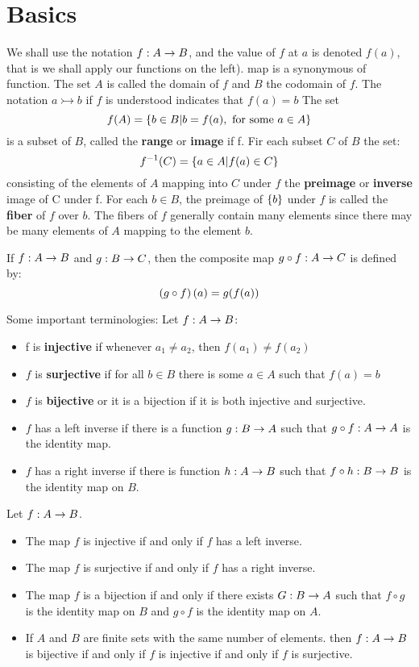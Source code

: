 \section{Basics}

We shall use the notation $ f : A \rightarrow B $, and the value of $f$ at $a$ is denoted $ f(a) $, that is we shall apply our functions on the left). map is a synonymous of function. The set $A$ is called the domain of $f$ and $B$ the codomain of $f$. The notation $ a \rightarrowtail b$ if $f$ is understood indicates that $ f(a) = b$ 
The set 
\[  f(A) = \left\lbrace b \in B | b = f(a), \textrm{ for some } a \in A \right\rbrace \]
is a subset of $ B $, called the \textbf{range } or \textbf{image} if f. Fir each subset $C$ of $B$ the set:
\[ f^{-1} (C) = \left\lbrace a \in A | f(a) \in C \right\rbrace \]
consisting of the elements of $A$ mapping into $C$ under $f$ the \textbf{preimage} or \textbf{inverse } image of C under f. For each $b \in B $, the preimage of $ \left\lbrace b \right\rbrace $ under $f$ is called the \textbf{fiber} of $f$ over $b$. The fibers of $f$ generally contain many elements since there may be many elements of $A$ mapping to the element $b$.

If $f : A \rightarrow B $ and $g : B \rightarrow C $, then the composite map $ g \circ f : A \rightarrow C $ is defined by:
\[ \left( g \circ f \right)(a) = g(f(a))\]

Some important terminologies:
Let $f : A \rightarrow B $:
\begin{itemize}
	\item f is \textbf{injective} if whenever $ a_1 \neq a_2 $, then $ f(a_1) \neq f(a_2) $
	\item $f$ is \textbf{surjective} if for all $b \in B$ there is some $a \in A$ such that $f(a) = b $
	\item $f$ is \textbf{bijective} or it is a bijection if it is both injective and surjective. 
	\item $f$ has a left inverse if there is a function $ g : B \rightarrow A $ such that $ g \circ f : A \rightarrow A $ is the identity map.
	\item $f$ has a right inverse if there is function $ h : A \rightarrow B $ such that $ f \circ h : B \rightarrow B $ is the identity map on $B$. 
\end{itemize}
\begin{prop}
	Let $ f : A \rightarrow B $.
	\begin{itemize}
		\item The map $f$ is injective if and only if $f$ has a left inverse.
		\item The map $f$ is surjective if and only if $f$ has a right inverse.
		\item The map $f$ is a bijection if and only if there exists $ G : B \rightarrow A $ such that $f \circ g$ is the identity map on $B$ and $ g \circ f $ is the identity map on  $A$.
		\item If $A$ and $B$ are finite sets with the same number of elements. then $f : A \rightarrow B$ is bijective if and only if $f$ is injective if and only if $f$ is surjective.
	\end{itemize}
\end{prop}

